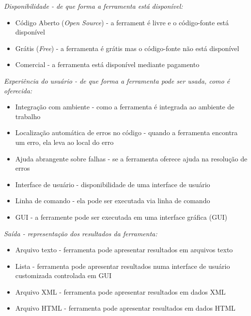 \begin{description}
  \item {\it Disponibilidade - de que forma a ferramenta está disponível:}
    \begin{itemize}
      \item Código Aberto ({\it Open Source}) - a ferrament é livre e o código-fonte está disponível
      \item Grátis ({\it Free}) - a ferramenta é grátis mas o código-fonte não está disponível
      \item Comercial - a ferramenta está disponível mediante pagamento
    \end{itemize}

  \item {\it Experiência do usuário - de que forma a ferramenta pode ser usada, como é oferecida:}
    \begin{itemize}
      \item Integração com ambiente - como a ferramenta é integrada ao ambiente de trabalho
      \item Localização automática de erros no código - quando a ferramenta encontra um erro, ela leva ao local do erro
      \item Ajuda abrangente sobre falhas - se a ferramenta oferece ajuda na resolução de erros
      \item Interface de usuário - disponibilidade de uma interface de usuário
      \item Linha de comando - ela pode ser executada via linha de comando
      \item GUI - a ferramente pode ser executada em uma interface gráfica (GUI)
    \end{itemize}

  \item {\it Saída - representação dos resultados da ferramenta:}
    \begin{itemize}
      \item Arquivo texto - ferramenta pode apresentar resultados em arquivos texto
      \item Lista - ferramenta pode apresentar resultados numa interface de usuário customizada controlada em GUI
      \item Arquivo XML - ferramenta pode apresentar resultados em dados XML
      \item Arquivo HTML - ferramenta pode apresentar resultados em dados HTML
    \end{itemize}

\end{description}

